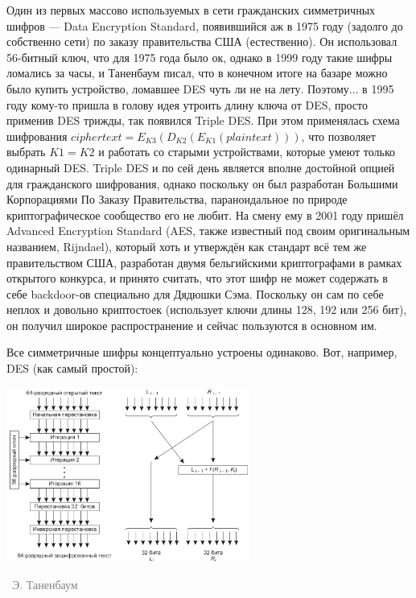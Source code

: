 \documentclass[a5paper]{article}
\newcommand{\attribution}[1] {
\vspace{-5mm}\begin{flushright}\begin{scriptsize}\textcolor{gray}{\textcopyright\, #1}\end{scriptsize}\end{flushright}
}
\begin{document}
Один из первых массово используемых в сети гражданских симметричных шифров --- Data Encryption Standard, появившийся аж в 1975 году (задолго до собственно сети) по заказу правительства США (естественно). Он использовал 56-битный ключ, что для 1975 года было ок, однако в 1999 году такие шифры ломались за часы, и Таненбаум писал, что в конечном итоге на базаре можно было купить устройство, ломавшее DES чуть ли не на лету. Поэтому... в 1995 году кому-то пришла в голову идея утроить длину ключа от DES, просто применив DES трижды, так появился Triple DES. При этом применялась схема шифрования $ciphertext = E_{K3}(D_{K2}(E_{K1}(plaintext)))$, что позволяет выбрать $K1 = K2$ и работать со старыми устройствами, которые умеют только одинарный DES. Triple DES и по сей день является вполне достойной опцией для гражданского шифрования, однако поскольку он был разработан Большими Корпорациями По Заказу Правительства, параноидальное по природе криптографическое сообщество его не любит. На смену ему в 2001 году пришёл Advanced Encryption Standard (AES, также известный под своим оригинальным названием, Rijndael), который хоть и утверждён как стандарт всё тем же правительством США, разработан двумя бельгийскими криптографами в рамках открытого конкурса, и принято считать, что этот шифр не может содержать в себе backdoor-ов специально для Дядюшки Сэма. Поскольку он сам по себе неплох и довольно криптостоек (использует ключи длины 128, 192 или 256 бит), он получил широкое распространение и сейчас пользуются в основном им.

Все симметричные шифры концептуально устроены одинаково. Вот, например, DES (как самый простой):

\begin{center}
    \includegraphics[width=0.6\textwidth]{des.png}
    \attribution{Э. Таненбаум}
\end{center}
\end{document}
